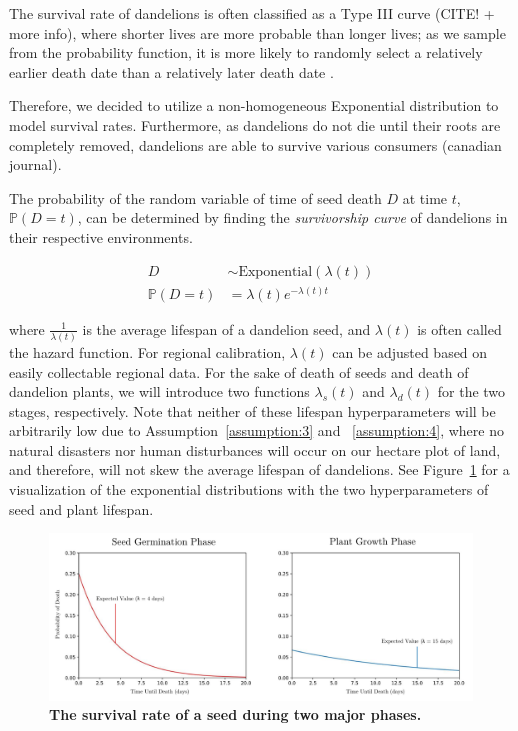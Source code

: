 The survival rate of dandelions is often classified as a Type III curve (CITE! + more info), where shorter lives are more probable than longer lives; as we sample from the probability function, it is more likely to randomly select a relatively earlier death date than a relatively later death date \cite{noauthor_dandelion_nodate-2}. 

Therefore, we decided to utilize a non-homogeneous Exponential distribution to model survival rates. Furthermore, as dandelions do not die until their roots are completely removed, dandelions are able to survive various consumers (canadian journal).

The probability of the random variable of time of seed death \(D\) at time \(t\), \(\mathbb{P}(D = t)\), can be determined by finding the \textit{survivorship curve} of dandelions in their respective environments. 

\begin{align}
    D & \sim \text{Exponential}(\lambda(t)) \nonumber  \\
    \mathbb{P}(D = t) & = \lambda(t) e^{-\lambda(t) t}
\end{align}

where \(\frac{1}{\lambda(t)}\) is the average lifespan of a dandelion seed, and \(\lambda(t)\) is often called the hazard function. For regional calibration, \(\lambda(t)\) can be adjusted based on easily collectable regional data. For the sake of death of seeds and death of dandelion plants, we will introduce two functions \(\lambda_s(t)\) and \(\lambda_d(t)\) for the two stages, respectively. Note that neither of these lifespan hyperparameters will be arbitrarily low due to Assumption~\ref{assumption:3} and ~\ref{assumption:4}, where no natural disasters nor human disturbances will occur on our hectare plot of land, and therefore, will not skew the average lifespan of dandelions. See Figure~\ref{fig:exponentialdistribution} for a visualization of the exponential distributions with the two hyperparameters of seed and plant lifespan.

\begin{figure}[h!]
\centering
    \includegraphics[scale=0.70]{figures/exponentialdistribution.pdf}
    \captionsetup{width=0.9\textwidth}
    \caption{\textbf{The survival rate of a seed during two major phases.}}
    \label{fig:exponentialdistribution}
\end{figure}

